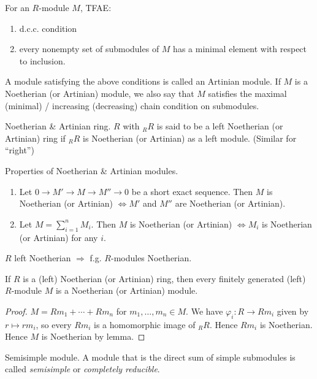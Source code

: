 \documentclass[11pt, a4paper]{report}
\begin{document}
\begin{proposition}
For an $R$-module $M$, TFAE:
\begin{enumerate}
\item[(1)] d.c.c. condition
\item[(2)] every nonempty set of submodules of $M$ has a minimal element with respect to inclusion.
\end{enumerate}
A module satisfying the above conditions is called an Artinian module. If $M$ is a Noetherian (or Artinian) module, we also say that $M$ satisfies the maximal (minimal) / increasing (decreasing) chain condition on submodules.
\end{proposition}

\begin{definition}
Noetherian \& Artinian ring. $R$ with ${}_R R$ is said to be a left Noetherian (or Artinian) ring if ${}_R R$ is Noetherian (or Artinian) as a left module. (Similar for ``right'')
\end{definition}

\begin{lemma}
Properties of Noetherian \& Artinian modules.
\begin{enumerate}
\item[(1)] Let $0 \rightarrow M' \rightarrow M \rightarrow M'' \rightarrow 0$ be a short exact sequence. Then $M$ is Noetherian (or Artinian) $\Leftrightarrow M'$ and $M''$ are Noetherian (or Artinian).
\item[(2)] Let $M = \sum_{i=1}^{n} M_i$. Then $M$ is Noetherian (or Artinian) $\Leftrightarrow M_i$ is Noetherian (or Artinian) for any $i$.
\end{enumerate}
\end{lemma}

\begin{theorem}
$R$ left Noetherian $\Rightarrow$ f.g. $R$-modules Noetherian.

If $R$ is a (left) Noetherian (or Artinian) ring, then every finitely generated (left) $R$-module $M$ is a Noetherian (or Artinian) module.
\end{theorem}

\begin{proof}
$M = R m_1 + \cdots + R m_n$ for $m_1, \ldots, m_n \in M$. We have $\varphi_i: R \rightarrow R m_i$ given by $r \mapsto r m_i$, so every $R m_i$ is a homomorphic image of ${}_R R$. Hence $R m_i$ is Noetherian. Hence $M$ is Noetherian by lemma.
\end{proof}

\begin{definition}
Semisimple module. A module that is the direct sum of simple submodules is called \emph{semisimple} or \emph{completely reducible}.
\end{definition}
\end{document}
